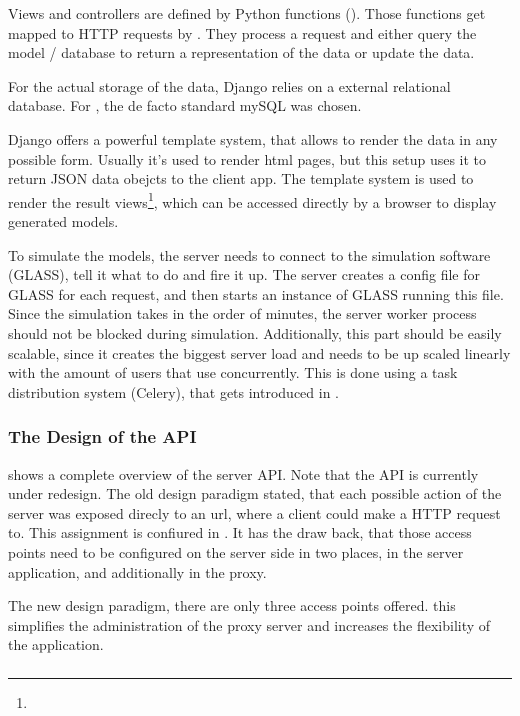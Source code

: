 Views and controllers are defined by Python functions ().
Those functions get mapped to HTTP requests by .
They process a request and either query the model / database to return a representation of the data or update the data.

For the actual storage of the data, Django relies on a external relational database.
For \spl, the de facto standard mySQL was chosen.

Django offers a powerful template system, that allows to render the data in any possible form.
Usually it's used to render html pages, but this setup uses it to return JSON data obejcts to the client app.
The template system is used to render the result views\footnote{}, which can be accessed directly by a browser to display generated models.

To simulate the models, the server needs to connect to the simulation software (GLASS), tell it what to do and fire it up.
The server creates a config file for GLASS for each request, and then starts an instance of GLASS running this file.
Since the simulation takes in the order of minutes, the server worker process should not be blocked during simulation.
Additionally, this part should be easily scalable, since it creates the biggest server load and needs to be up scaled linearly with the amount of users that use \spl concurrently.
This is done using a task distribution system (Celery), that gets introduced in .







\subsubsection{The Design of the API}





 shows a complete overview of the server API.
Note that the API is currently under redesign.
The old design paradigm stated, that each possible action of the server was exposed direcly to an url, where a client could make a HTTP request to. This assignment is confiured in .
It has the draw back, that those access points need to be configured on the server side in two places, in the server application, and additionally in the proxy.

The new design paradigm, there are only three access points offered. this simplifies the administration of the proxy server and increases the flexibility of the application.




\subsubsection{}
